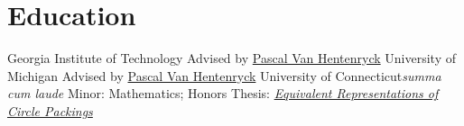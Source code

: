 \section{Education}
		{Georgia Institute of Technology}{}{}
		{Advised by \href{https://www.isye.gatech.edu/users/pascal-van-hentenryck}{Pascal Van Hentenryck}}
		{University of Michigan}{}{}
		{Advised by \href{https://www.isye.gatech.edu/users/pascal-van-hentenryck}{Pascal Van Hentenryck}}
		{University of Connecticut}{}{\textit{summa cum laude}}
		{Minor: Mathematics; Honors Thesis: \href{}{\textit{Equivalent Representations of Circle Packings}}}

